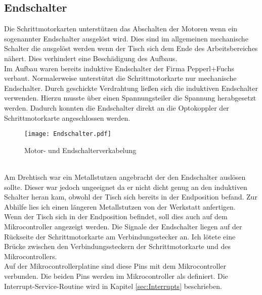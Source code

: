 \subsection{Endschalter}
Die Schrittmotorkarten unterstützen das Abschalten der Motoren wenn ein sogenannter Endschalter ausgelöst wird. Dies sind im allgemeinen mechanische Schalter die ausgelöst werden wenn der Tisch sich dem Ende des Arbeitsbereiches nähert. Dies verhindert eine Beschädigung des Aufbaus.\\
Im Aufbau waren bereits induktive Endschalter der Firma Pepperl+Fuchs verbaut. 
Normalerweise unterstützt die Schrittmotorkarte nur mechanische Endschalter. Durch geschickte Verdrahtung ließen sich die induktiven Endschalter verwenden. Hierzu musste über einen Spannungsteiler die Spannung herabgesetzt werden. Dadurch konnten die Endschalter direkt an die Optokoppler der Schrittmotorkarte angeschlossen werden. 
\begin{figure}[htb]
\centering
\texttt{[image: Endschalter.pdf]}
\caption{Motor- und Endschalterverkabelung}
\label{fig:Motorverkabelung}
\end{figure}\\
Am Drehtisch war ein Metallstutzen angebracht der den Endschalter auslösen sollte. Dieser war jedoch ungeeignet da er nicht dicht genug an den induktiven Schalter heran kam, obwohl der Tisch sich bereits in der Endposition befand. Zur Abhilfe lies ich einen längeren Metallstutzen von der Werkstatt anfertigen.\\
Wenn der Tisch sich in der Endposition befindet, soll dies auch auf dem Mikrocontroller angezeigt werden. Die Signale der Endschalter liegen auf der Rückseite der Schrittmotorkarte  am Verbindungsstecker an. Ich lötete eine Brücke zwischen den Verbindungssteckern der Schrittmotorkarte und des Mikrocontrollers.\\
Auf der Mikrocontrollerplatine sind diese Pins mit dem Mikrocontroller verbunden. Die beiden Pins werden im Mikrocontroller als  definiert. Die Interrupt-Service-Routine wird in Kapitel \ref{sec:Interrupts} beschrieben.

